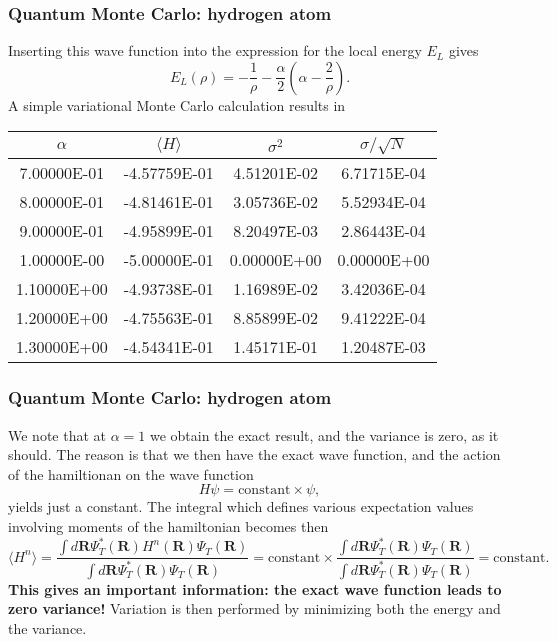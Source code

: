 \documentclass{beamer}
\begin{document}
\begin{frame}
\frametitle{Quantum Monte Carlo: hydrogen atom}

\begin{block}{}
Inserting this wave function into the expression for the
local energy $E_L$ gives
\[
   E_L(\rho)=-\frac{1}{\rho}-
              \frac{\alpha}{2}\left(\alpha-\frac{2}{\rho}\right).
\]
A simple variational Monte Carlo calculation results in

{\footnotesize
\begin{tabular}{cccc}
\hline
\multicolumn{1}{c}{ $\alpha$ } & \multicolumn{1}{c}{ $\langle H \rangle $ } & \multicolumn{1}{c}{ $\sigma^2$ } & \multicolumn{1}{c}{ $\sigma/\sqrt{N}$ } \\
\hline
7.00000E-01 & -4.57759E-01         & 4.51201E-02 & 6.71715E-04       \\
8.00000E-01 & -4.81461E-01         & 3.05736E-02 & 5.52934E-04       \\
9.00000E-01 & -4.95899E-01         & 8.20497E-03 & 2.86443E-04       \\
1.00000E-00 & -5.00000E-01         & 0.00000E+00 & 0.00000E+00       \\
1.10000E+00 & -4.93738E-01         & 1.16989E-02 & 3.42036E-04       \\
1.20000E+00 & -4.75563E-01         & 8.85899E-02 & 9.41222E-04       \\
1.30000E+00 & -4.54341E-01         & 1.45171E-01 & 1.20487E-03       \\
\hline
\end{tabular}
}

\noindent
\end{block}
\end{frame}

\begin{frame}
\frametitle{Quantum Monte Carlo: hydrogen atom}

\begin{block}{}

We note that at $\alpha=1$ we obtain the exact
result, and the variance is zero, as it should. The reason is that 
we then have the exact wave function, and the action of the hamiltionan
on the wave function
\[
   H\psi = \mathrm{constant}\times \psi,
\]
yields just a constant. The integral which defines various 
expectation values involving moments of the hamiltonian becomes then
\[
   \langle H^n \rangle =
   \frac{\int d\bm{R}\Psi^{\ast}_T(\bm{R})H^n(\bm{R})\Psi_T(\bm{R})}
        {\int d\bm{R}\Psi^{\ast}_T(\bm{R})\Psi_T(\bm{R})}=
\mathrm{constant}\times\frac{\int d\bm{R}\Psi^{\ast}_T(\bm{R})\Psi_T(\bm{R})}
        {\int d\bm{R}\Psi^{\ast}_T(\bm{R})\Psi_T(\bm{R})}=\mathrm{constant}.
\]
\textbf{This gives an important information: the exact wave function leads to zero variance!}
Variation is then performed by minimizing both the energy and the variance.
\end{block}
\end{frame}
\end{document}
